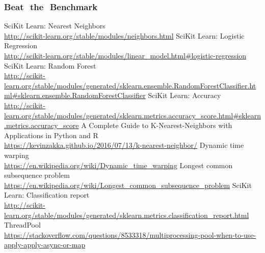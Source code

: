 \documentclass[12pt]{article}
\begin{document}
	\subsubsection{Beat ​ ​the ​ ​Benchmark}
	
	\newpage
	\begin{thebibliography}{30}
		SciKit Learn: Nearest Neighbors \\
		 \url{http://scikit-learn.org/stable/modules/neighbors.html}
		  SciKit Learn: Logistic Regression \\
		 \url{http://scikit-learn.org/stable/modules/linear_model.html#logistic-regression}
		  SciKit Learn: Random Forest \\
		 \url{http://scikit-learn.org/stable/modules/generated/sklearn.ensemble.RandomForestClassifier.html#sklearn.ensemble.RandomForestClassifier}
		  SciKit Learn: Accuracy \\
		 \url{http://scikit-learn.org/stable/modules/generated/sklearn.metrics.accuracy_score.html#sklearn.metrics.accuracy_score}
		 A Complete Guide to K-Nearest-Neighbors with Applications in Python and R \\
		 \url{https://kevinzakka.github.io/2016/07/13/k-nearest-neighbor/}
		  Dynamic time warping \\
		 \url{https://en.wikipedia.org/wiki/Dynamic_time_warping}
		  Longest common subsequence problem \\
		 \url{https://en.wikipedia.org/wiki/Longest_common_subsequence_problem}
		  SciKit Learn: Classification report \\
		 \url{http://scikit-learn.org/stable/modules/generated/sklearn.metrics.classification_report.html}
		  ThreadPool \\
		 \url{https://stackoverflow.com/questions/8533318/multiprocessing-pool-when-to-use-apply-apply-async-or-map}
    \end{thebibliography}
	
\end{document}
